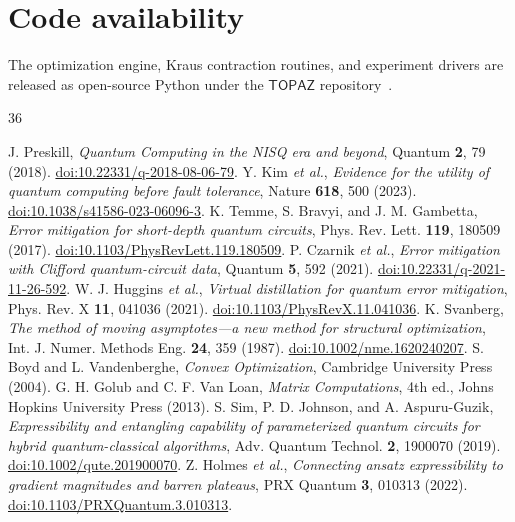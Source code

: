 \documentclass[twocolumn,aps,prl,superscriptaddress,showkeys]{revtex4-2}
\theoremstyle{plain}
\theoremstyle{definition}
\begin{document}
\section*{Code availability}
The optimization engine, Kraus contraction routines, and experiment drivers are released as open-source Python under the $\mathsf{TOPAZ}$ repository~\cite{TopazV1}.

\begin{thebibliography}{36}

 J. Preskill, \textit{Quantum Computing in the NISQ era and beyond}, Quantum \textbf{2}, 79 (2018). \href{https://doi.org/10.22331/q-2018-08-06-79}{doi:10.22331/q-2018-08-06-79}.
 Y. Kim \textit{et al.}, \textit{Evidence for the utility of quantum computing before fault tolerance}, Nature \textbf{618}, 500 (2023). \href{https://doi.org/10.1038/s41586-023-06096-3}{doi:10.1038/s41586-023-06096-3}.
 K. Temme, S. Bravyi, and J. M. Gambetta, \textit{Error mitigation for short-depth quantum circuits}, Phys. Rev. Lett. \textbf{119}, 180509 (2017). \href{https://doi.org/10.1103/PhysRevLett.119.180509}{doi:10.1103/PhysRevLett.119.180509}.
 P. Czarnik \textit{et al.}, \textit{Error mitigation with Clifford quantum-circuit data}, Quantum \textbf{5}, 592 (2021). \href{https://doi.org/10.22331/q-2021-11-26-592}{doi:10.22331/q-2021-11-26-592}.
 W. J. Huggins \textit{et al.}, \textit{Virtual distillation for quantum error mitigation}, Phys. Rev. X \textbf{11}, 041036 (2021). \href{https://doi.org/10.1103/PhysRevX.11.041036}{doi:10.1103/PhysRevX.11.041036}.
 K. Svanberg, \textit{The method of moving asymptotes---a new method for structural optimization}, Int. J. Numer. Methods Eng. \textbf{24}, 359 (1987). \href{https://doi.org/10.1002/nme.1620240207}{doi:10.1002/nme.1620240207}.
 S. Boyd and L. Vandenberghe, \textit{Convex Optimization}, Cambridge University Press (2004).
 G. H. Golub and C. F. Van Loan, \textit{Matrix Computations}, 4th ed., Johns Hopkins University Press (2013).
 S. Sim, P. D. Johnson, and A. Aspuru-Guzik, \textit{Expressibility and entangling capability of parameterized quantum circuits for hybrid quantum-classical algorithms}, Adv. Quantum Technol. \textbf{2}, 1900070 (2019). \href{https://doi.org/10.1002/qute.201900070}{doi:10.1002/qute.201900070}.
 Z. Holmes \textit{et al.}, \textit{Connecting ansatz expressibility to gradient magnitudes and barren plateaus}, PRX Quantum \textbf{3}, 010313 (2022). \href{https://doi.org/10.1103/PRXQuantum.3.010313}{doi:10.1103/PRXQuantum.3.010313}.

\end{thebibliography}
\end{document}
